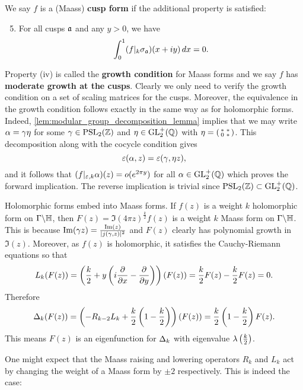     We say $f$ is a (Maass) \textbf{cusp form} if the additional property is satisfied:
    \begin{enumerate}[label=(\roman*)]
      \setcounter{enumi}{4}
      \item For all cusps $\mathfrak{a}$ and any $y > 0$, we have
      \[
        \int_{0}^{1}(f|_{k}\sigma_{\mathfrak{a}})(x+iy)\,dx = 0.
      \]
    \end{enumerate}
    Property (iv) is called the \textbf{growth condition} for Maass forms and we say $f$ has \textbf{moderate growth at the cusps}. Clearly we only need to verify the growth condition on a set of scaling matrices for the cusps. Moreover, the equivalence in the growth condition follows exactly in the same way as for holomorphic forms. Indeed, \cref{lem:modular_group_decomposition_lemma} implies that we may write $\alpha = \gamma\eta$ for some $\gamma \in \mathrm{PSL}_{2}(\mathbb{Z})$ and $\eta \in \mathrm{GL}_{2}^{+}(\mathbb{Q})$ with $\eta = \begin{psmallmatrix} \ast & \ast \\ 0 & \ast \end{psmallmatrix}$. This decomposition along with the cocycle condition gives
    \[
      \varepsilon(\alpha,z) = \varepsilon(\gamma,\eta z),
    \]
    and it follows that $(f|_{\varepsilon,k}\alpha)(z) = o(e^{2\pi y})$ for all $\alpha \in \mathrm{GL}_{2}^{+}(\mathbb{Q})$ which proves the forward implication. The reverse implication is trivial since $\mathrm{PSL}_{2}(\mathbb{Z}) \subset \mathrm{GL}_{2}^{+}(\mathbb{Q})$. 

    \begin{remark}\label{rem:holomorphic_embedds_into_Maass}
      Holomorphic forms embed into Maass forms. If $f(z)$ is a weight $k$ holomorphic form on $\Gamma\backslash\mathbb{H}$, then $F(z) = \Im(4\pi z)^{\frac{k}{2}}f(z)$ is a weight $k$ Maass form on $\Gamma\backslash\mathbb{H}$. This is because $\mathrm{Im}(\gamma z) = \frac{\mathrm{Im}(z)}{|j(\gamma,z)|^{2}}$ and $F(z)$ clearly has polynomial growth in $\Im(z)$. Moreover, as $f(z)$ is holomorphic, it satisfies the Cauchy-Riemann equations so that
      \[
        L_{k}(F(z)) = \left(\frac{k}{2}+y\left(i\frac{\partial}{\partial x}-\frac{\partial}{\partial y}\right)\right)(F(z)) = \frac{k}{2}F(z)-\frac{k}{2}F(z) = 0.
      \]
      Therefore
      \[
        \Delta_{k}(F(z)) = \left(-R_{k-2}L_{k}+\frac{k}{2}\left(1-\frac{k}{2}\right)\right)(F(z)) = \frac{k}{2}\left(1-\frac{k}{2}\right)F(z).
      \]
      This means $F(z)$ is an eigenfunction for $\Delta_{k}$ with eigenvalue $\lambda\left(\frac{k}{2}\right)$.
    \end{remark}

    One might expect that the Maass raising and lowering operators $R_{k}$ and $L_{k}$ act by changing the weight of a Maass form by $\pm 2$ respectively. This is indeed the case:

